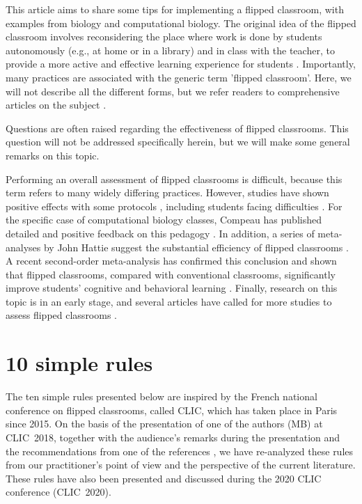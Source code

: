 \documentclass[10pt,letterpaper]{article}
\begin{document}
This article aims to share some tips for implementing a flipped classroom, with examples from biology and computational biology. 
The original idea of the flipped classroom involves reconsidering the place where work is done by students autonomously (e.g., at home or in a library) and in class with the teacher, to provide a more active and effective learning experience for students \cite{bergmann_flip_2012,schell_flipping_2015}. 
Importantly, many practices are associated with the generic term 'flipped classroom'.
Here, we will not describe all the different forms, but we refer readers to comprehensive articles on the subject
\cite{bishop_flipped_2013,lebrun_vers_2016}.

Questions are often raised regarding the effectiveness of flipped classrooms. This question will not be addressed specifically herein, but we will make some general remarks on this topic.

Performing an overall assessment of flipped classrooms is difficult, because this term refers to many widely differing practices. However, studies have shown positive effects with some protocols
\cite{casasola_can_2017, crouch_peer_2001, freeman_reply_2014}, including students facing
difficulties \cite{lage_inverting_2000}. For the specific case of computational biology classes, 
Compeau has published detailed and positive feedback on this pedagogy \cite{compeau_establishing_2019}.
In addition, a series of meta-analyses by John Hattie \cite{hattie2014, hattie2018} suggest the substantial efficiency of flipped classrooms
\cite{chen_academic_2019,hew_flipped_2018,karagol_effect_2019,tan_effectiveness_2017}. 
A recent second-order meta-analysis has confirmed this conclusion and shown that flipped classrooms, compared with conventional classrooms,
significantly improve students’ cognitive and behavioral learning \cite{hew_does_2020}.
Finally, research on this topic is in an early stage, and several articles have called for more studies to assess
flipped classrooms 
\cite{abeysekera_motivation_2015,bishop_flipped_2013,hew_does_2020,lo_critical_2017}.


\section{10 simple rules}

The ten simple rules presented below are inspired by the French national conference on flipped classrooms, called CLIC, which has taken place 
in Paris since 2015. On the basis of the presentation of one of the authors (MB) at CLIC~2018, together with the audience’s remarks 
during the presentation and the recommendations from one of the references \cite{lo_critical_2017}, we have re-analyzed these rules from our practitioner's point of view and the perspective of the current literature.
These rules have also been presented and discussed during the 2020 CLIC conference (CLIC~2020).
\end{document}
